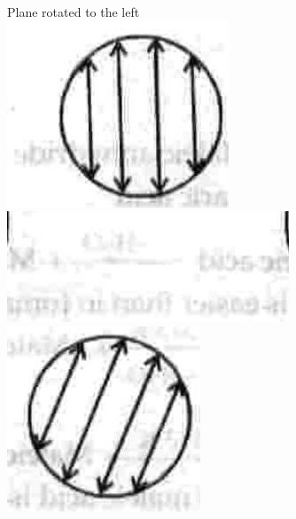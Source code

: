 \documentclass[10pt]{article}
\begin{document}
Plane rotated to the left\\
\includegraphics[max width=\textwidth, center]{2025_01_28_8470952b98110cec3aabg-048(5)}\\
\includegraphics[max width=\textwidth, center]{2025_01_28_8470952b98110cec3aabg-048(6)}\\
\includegraphics[max width=\textwidth, center]{2025_01_28_8470952b98110cec3aabg-048(2)}
\end{document}
